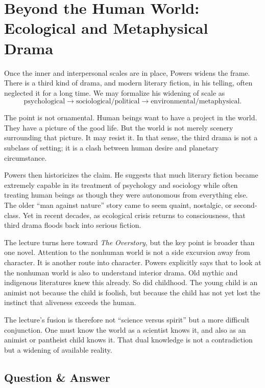 \section{Beyond the Human World: Ecological and Metaphysical Drama}

Once the inner and interpersonal scales are in place, Powers widens the frame. There is a third kind of drama, and modern literary fiction, in his telling, often neglected it for a long time. We may formalize his widening of scale as
\begin{equation}
\text{psychological} \to \text{sociological/political} \to \text{environmental/metaphysical}.
\end{equation}

The point is not ornamental. Human beings want to have a project in the world. They have a picture of the good life. But the world is not merely scenery surrounding that picture. It may resist it. In that sense, the third drama is not a subclass of setting; it is a clash between human desire and planetary circumstance.

Powers then historicizes the claim. He suggests that much literary fiction became extremely capable in its treatment of psychology and sociology while often treating human beings as though they were autonomous from everything else. The older ``man against nature'' story came to seem quaint, nostalgic, or second-class. Yet in recent decades, as ecological crisis returns to consciousness, that third drama floods back into serious fiction.

The lecture turns here toward \emph{The Overstory}, but the key point is broader than one novel. Attention to the nonhuman world is not a side excursion away from character. It is another route into character. Powers explicitly says that to look at the nonhuman world is also to understand interior drama. Old mythic and indigenous literatures knew this already. So did childhood. The young child is an animist not because the child is foolish, but because the child has not yet lost the instinct that aliveness exceeds the human.

The lecture's fusion is therefore not ``science versus spirit'' but a more difficult conjunction. One must know the world as a scientist knows it, and also as an animist or pantheist child knows it. That dual knowledge is not a contradiction but a widening of available reality.

\subsection{Question \& Answer}

